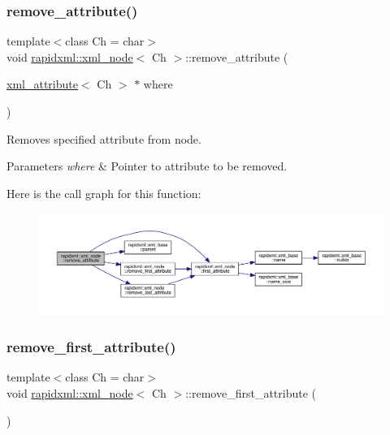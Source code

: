 \subsubsection{\texorpdfstring{remove\_attribute()}{remove\_attribute()}}
{\footnotesize\ttfamily template$<$class Ch = char$>$ \\
void \mbox{\hyperlink{classrapidxml_1_1xml__node}{rapidxml\+::xml\+\_\+node}}$<$ Ch $>$\+::remove\+\_\+attribute (\begin{DoxyParamCaption}\item[{\mbox{\hyperlink{classrapidxml_1_1xml__attribute}{xml\+\_\+attribute}}$<$ Ch $>$ $\ast$}]{where }\end{DoxyParamCaption})\hspace{0.3cm}{\ttfamily [inline]}}

Removes specified attribute from node. 
\begin{DoxyParams}{Parameters}
{\em where} & Pointer to attribute to be removed. \\
\hline
\end{DoxyParams}
Here is the call graph for this function\+:\nopagebreak
\begin{figure}[H]
\begin{center}
\leavevmode
\includegraphics[width=350pt]{classrapidxml_1_1xml__node_a6f97b1b4f46a94a4587915df3c0c6b57_cgraph}
\end{center}
\end{figure}
\mbox{\label{classrapidxml_1_1xml__node_aa95192d2a165cca16c551ed2a2a06aec}} 
\subsubsection{\texorpdfstring{remove\_first\_attribute()}{remove\_first\_attribute()}}
{\footnotesize\ttfamily template$<$class Ch = char$>$ \\
void \mbox{\hyperlink{classrapidxml_1_1xml__node}{rapidxml\+::xml\+\_\+node}}$<$ Ch $>$\+::remove\+\_\+first\+\_\+attribute (\begin{DoxyParamCaption}{ }\end{DoxyParamCaption})\hspace{0.3cm}{\ttfamily [inline]}}

